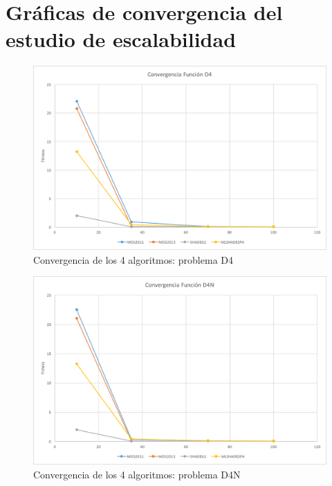 \chapter{Gráficas de convergencia del estudio de escalabilidad}


\begin{figure}[H]
	\centering
	\includegraphics[scale=0.6]{imagenes/ConvergenciaD4}
	\caption{Convergencia de los 4 algoritmos: problema D4}
	\label{fig:ConvgD4}
\end{figure}

\begin{figure}[H]
	\centering
	\includegraphics[scale=0.6]{imagenes/ConvergenciaD4N}
	\caption{Convergencia de los 4 algoritmos: problema D4N}
	\label{fig:ConvgD4N}
\end{figure}

